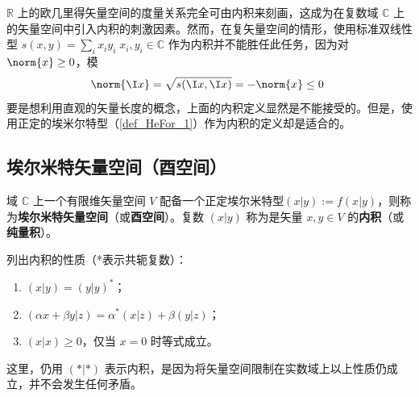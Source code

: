 
\begin{issues}
\issueTODO
\end{issues}

$\mathbb{R}$ 上的欧几里得矢量空间的度量关系完全可由内积来刻画，这成为在复数域 $\mathbb{C}$ 上的矢量空间中引入内积的刺激因素。然而，在复矢量空间的情形，使用标准双线性型 $s( x, y)=\sum_{i}x_iy_i\;x_i,y_i\in\mathbb{C}$ 作为内积并不能胜任此任务，因为对 $\norm{x}\geq0$，模
\begin{equation}
\norm{\I x}=\sqrt{s(\I x,\I x)}=-\norm{ x}\leq0~
\end{equation}
要是想利用直观的矢量长度的概念，上面的内积定义显然是不能接受的。但是，使用正定的埃米尔特型（\autoref{def_HeFor_1}）作为内积的定义却是适合的。
\subsection{埃尔米特矢量空间（酉空间）}
\begin{definition}{}\label{def_HVorUV_1}
域 $\mathbb{C}$ 上一个有限维矢量空间 $V$ 配备一个正定埃尔米特型$( x|  y):=f(  x|  y)$，则称为\textbf{埃尔米特矢量空间}（或\textbf{酉空间}）。复数 $(  x|  y)$ 称为是矢量 $  x,  y\in V$ 的\textbf{内积}（或\textbf{纯量积}）。
\end{definition}
列出内积的性质（*表示共轭复数）：
\begin{enumerate}
\item $(  x|  y)=(  y|  y)^*$；
\item $(\alpha  x+\beta  y|  z)=\alpha^*(  x|  z)+\beta(  y|  z)$；
\item $(  x|  x)\geq0$，仅当 $  x=  0$ 时等式成立。
\end{enumerate}

这里，仍用 $(*|*)$ 表示内积，是因为将矢量空间限制在实数域上以上性质仍成立，并不会发生任何矛盾。

